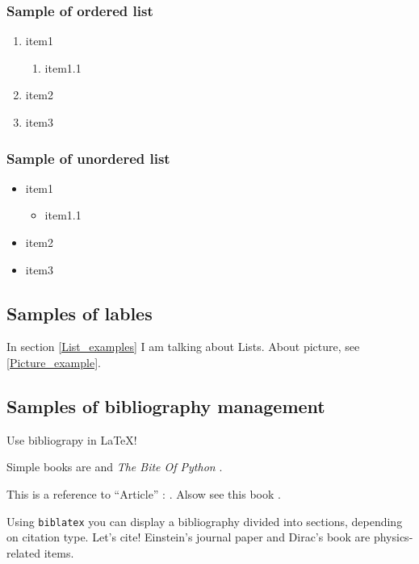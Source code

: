 \subsubsection{Sample of ordered list}
\begin{enumerate}
    \item item1
        \begin{enumerate}
            \item item1.1
        \end{enumerate}
    \item item2
    \item item3
\end{enumerate}

\subsubsection{Sample of unordered list}
\begin{itemize}
    \item item1
        \begin{itemize}
            \item item1.1
        \end{itemize}
    \item item2
    \item item3
\end{itemize}

\subsection{Samples of lables}
In section \ref{List_examples} I am talking about Lists. About picture, see \ref{Picture_example}.

\subsection{Samples of bibliography management}
Use bibliograpy in \LaTeX{}!

Simple books are \parencite{example-book} and \textit{The Bite Of Python} \parencite{chitlur2014}.

This is a reference to ``Article'' : \parencite{example-article}. Alsow see this book \parencite{example-incollection}.

Using \texttt{biblatex} you can display a bibliography divided into sections, depending on citation type.  Let's cite! Einstein's journal paper \parencite{example-article} and Dirac's book \parencite{example-book} are physics-related items.

